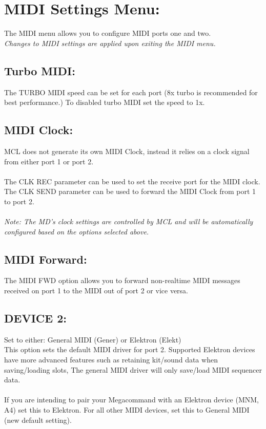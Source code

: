 \chapter{MIDI Settings Menu:}
The MIDI menu allows you to configure MIDI ports one and two.
\\
\textit{Changes to MIDI settings are applied upon exiting the MIDI menu.}

\section{Turbo MIDI:}
The TURBO MIDI speed can be set for each port (8x turbo is recommended for best performance.) To disabled turbo MIDI set the speed to 1x.
\section{MIDI Clock:}
MCL does not generate its own MIDI Clock, instead it relies on a clock signal from either port 1 or port 2.\\\\
The CLK REC parameter can be used to set the receive port for the MIDI clock.\\
The CLK SEND parameter can be used to forward the MIDI Clock from port 1 to port 2.\\\\
\textit{Note: The MD's clock settings are controlled by MCL and will be automatically configured based on the options selected above.}

\section{MIDI Forward:}
The MIDI FWD option allows you to forward non-realtime MIDI messages received on port 1 to the MIDI out of port 2 or vice versa.
\section{DEVICE 2: }
Set to either: General MIDI (Gener) or Elektron (Elekt)\\

This option sets the default MIDI driver for port 2. Supported Elektron devices have
more advanced features such as retaining kit/sound data when saving/loading slots,
The general MIDI driver will only save/load MIDI sequencer data.\\
\\
If you are intending to pair your Megacommand with an Elektron device
(MNM, A4) set this to Elektron. For all other MIDI devices, set this to General MIDI (new default setting).